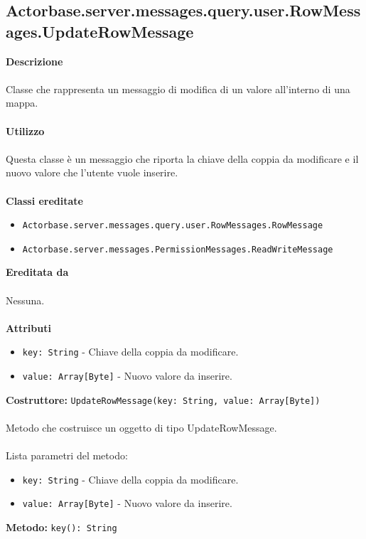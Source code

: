 \documentclass[a4paper]{article}
\begin{document}
	\subsection{Actorbase.server.messages.query.user.RowMessages.UpdateRowMessage}
		\textbf{Descrizione}
			\\ \\
		Classe che rappresenta un messaggio di modifica di un valore all'interno di una mappa.
			\\ \\
		\textbf{Utilizzo}
			\\ \\
		Questa classe è un messaggio che riporta la chiave della coppia da modificare e il nuovo valore che l'utente vuole inserire.
			\\ \\
		\textbf{Classi ereditate}
			\begin{itemize}
				\item \texttt{Actorbase.server.messages.query.user.RowMessages.RowMessage }
				\item \texttt{Actorbase.server.messages.PermissionMessages.ReadWriteMessage }
			\end{itemize}
		\textbf{Ereditata da}
			\\ \\
			Nessuna.
			\\ \\
		\textbf{Attributi}
			\begin{itemize}
				\item \texttt{key: String} - Chiave della coppia da modificare.
				\item \texttt{value: Array[Byte]} - Nuovo valore da inserire.
			\end{itemize}
		\textbf{Costruttore: }\texttt{UpdateRowMessage(key: String, value: Array[Byte])}
			\\ \\
		Metodo che costruisce un oggetto di tipo UpdateRowMessage.
			\\ \\
		Lista parametri del metodo:
			\begin{itemize}
				\item \texttt{key: String} - Chiave della coppia da modificare.
				\item \texttt{value: Array[Byte]} - Nuovo valore da inserire.
			\end{itemize}
		\textbf{Metodo: }\texttt{key(): String}
			\\ \\
\end{document}

